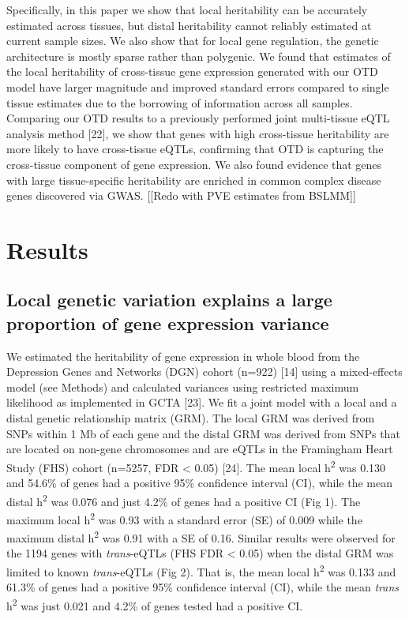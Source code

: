 \documentclass[]{article}
\begin{document}
Specifically, in this paper we show that local heritability can be
accurately estimated across tissues, but distal heritability cannot
reliably estimated at current sample sizes. We also show that for local
gene regulation, the genetic architecture is mostly sparse rather than
polygenic. We found that estimates of the local heritability of
cross-tissue gene expression generated with our OTD model have larger
magnitude and improved standard errors compared to single tissue
estimates due to the borrowing of information across all samples.
Comparing our OTD results to a previously performed joint multi-tissue
eQTL analysis method {[}22{]}, we show that genes with high cross-tissue
heritability are more likely to have cross-tissue eQTLs, confirming that
OTD is capturing the cross-tissue component of gene expression. We also
found evidence that genes with large tissue-specific heritability are
enriched in common complex disease genes discovered via GWAS. {[}{[}Redo
with PVE estimates from BSLMM{]}{]}

\section{Results}\label{results}

\subsection{Local genetic variation explains a large proportion of gene
expression
variance}\label{local-genetic-variation-explains-a-large-proportion-of-gene-expression-variance}

We estimated the heritability of gene expression in whole blood from the
Depression Genes and Networks (DGN) cohort (n=922) {[}14{]} using a
mixed-effects model (see Methods) and calculated variances using
restricted maximum likelihood as implemented in GCTA {[}23{]}. We fit a
joint model with a local and a distal genetic relationship matrix (GRM).
The local GRM was derived from SNPs within 1 Mb of each gene and the
distal GRM was derived from SNPs that are located on non-gene
chromosomes and are eQTLs in the Framingham Heart Study (FHS) cohort
(n=5257, FDR \textless{} 0.05) {[}24{]}. The mean local
h\textsuperscript{2} was 0.130 and 54.6\% of genes had a positive 95\%
confidence interval (CI), while the mean distal h\textsuperscript{2} was
0.076 and just 4.2\% of genes had a positive CI (Fig 1). The maximum
local h\textsuperscript{2} was 0.93 with a standard error (SE) of 0.009
while the maximum distal h\textsuperscript{2} was 0.91 with a SE of
0.16. Similar results were observed for the 1194 genes with
\emph{trans}-eQTLs (FHS FDR \textless{} 0.05) when the distal GRM was
limited to known \emph{trans}-eQTLs (Fig 2). That is, the mean local
h\textsuperscript{2} was 0.133 and 61.3\% of genes had a positive 95\%
confidence interval (CI), while the mean \emph{trans}
h\textsuperscript{2} was just 0.021 and 4.2\% of genes tested had a
positive CI.
\end{document}
